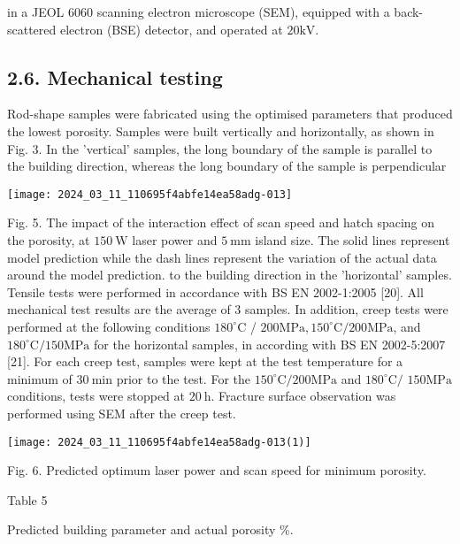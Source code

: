 \documentclass[10pt]{article}
\begin{document}
in a JEOL 6060 scanning electron microscope (SEM), equipped with a back-scattered electron (BSE) detector, and operated at $20 \mathrm{kV}$.

\subsection*{2.6. Mechanical testing}
Rod-shape samples were fabricated using the optimised parameters that produced the lowest porosity. Samples were built vertically and horizontally, as shown in Fig. 3. In the 'vertical' samples, the long boundary of the sample is parallel to the building direction, whereas the long boundary of the sample is perpendicular

\begin{center}
\texttt{[image: 2024\_03\_11\_110695f4abfe14ea58adg-013]}
\end{center}

Fig. 5. The impact of the interaction effect of scan speed and hatch spacing on the porosity, at $150 \mathrm{~W}$ laser power and $5 \mathrm{~mm}$ island size. The solid lines represent model prediction while the dash lines represent the variation of the actual data around the model prediction. to the building direction in the 'horizontal' samples. Tensile tests were performed in accordance with BS EN 2002-1:2005 [20]. All mechanical test results are the average of 3 samples. In addition, creep tests were performed at the following conditions $180^{\circ} \mathrm{C}$ / $200 \mathrm{MPa}, 150^{\circ} \mathrm{C} / 200 \mathrm{MPa}$, and $180^{\circ} \mathrm{C} / 150 \mathrm{MPa}$ for the horizontal samples, in according with BS EN 2002-5:2007 [21]. For each creep test, samples were kept at the test temperature for a minimum of $30 \mathrm{~min}$ prior to the test. For the $150^{\circ} \mathrm{C} / 200 \mathrm{MPa}$ and $180^{\circ} \mathrm{C} /$ $150 \mathrm{MPa}$ conditions, tests were stopped at $20 \mathrm{~h}$. Fracture surface observation was performed using SEM after the creep test.

\begin{center}
\texttt{[image: 2024\_03\_11\_110695f4abfe14ea58adg-013(1)]}
\end{center}

Fig. 6. Predicted optimum laser power and scan speed for minimum porosity.

Table 5

Predicted building parameter and actual porosity \%.
\end{document}

